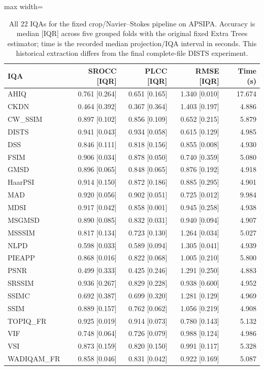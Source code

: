 \begin{table}[t!]
\centering
\caption{All 22 IQAs for the fixed crop/Navier--Stokes pipeline on APSIPA. Accuracy is median [IQR] across five grouped folds with the original fixed Extra Trees estimator; time is the recorded median projection/IQA interval in seconds. This historical extraction differs from the final complete-file DISTS experiment.}
\label{tab_review_projection_iqas}
\scriptsize
\begin{adjustbox}{max width=\textwidth}
\begin{tabular}{lrrrr}
\toprule
IQA & SROCC [IQR] & PLCC [IQR] & RMSE [IQR] & Time (s) \\
\midrule
AHIQ & 0.761 [0.264] & 0.651 [0.165] & 1.340 [0.010] & 17.674 \\
CKDN & 0.464 [0.392] & 0.367 [0.364] & 1.403 [0.197] & 4.886 \\
CW\_SSIM & 0.897 [0.102] & 0.856 [0.109] & 0.652 [0.215] & 5.879 \\
DISTS & 0.941 [0.043] & 0.934 [0.058] & 0.615 [0.129] & 4.985 \\
DSS & 0.846 [0.111] & 0.818 [0.156] & 0.855 [0.008] & 4.930 \\
FSIM & 0.906 [0.034] & 0.878 [0.050] & 0.740 [0.359] & 5.080 \\
GMSD & 0.896 [0.065] & 0.848 [0.065] & 0.876 [0.192] & 4.918 \\
HaarPSI & 0.914 [0.150] & 0.872 [0.186] & 0.885 [0.295] & 4.901 \\
MAD & 0.920 [0.056] & 0.902 [0.051] & 0.725 [0.012] & 9.984 \\
MDSI & 0.917 [0.042] & 0.858 [0.001] & 0.945 [0.258] & 4.938 \\
MSGMSD & 0.890 [0.085] & 0.832 [0.031] & 0.940 [0.094] & 4.907 \\
MSSSIM & 0.817 [0.134] & 0.723 [0.130] & 1.264 [0.034] & 5.027 \\
NLPD & 0.598 [0.033] & 0.589 [0.094] & 1.305 [0.041] & 4.939 \\
PIEAPP & 0.868 [0.016] & 0.822 [0.068] & 1.005 [0.210] & 5.800 \\
PSNR & 0.499 [0.333] & 0.425 [0.246] & 1.291 [0.250] & 4.883 \\
SRSSIM & 0.936 [0.267] & 0.829 [0.228] & 0.938 [0.600] & 4.952 \\
SSIMC & 0.692 [0.387] & 0.699 [0.320] & 1.281 [0.129] & 4.969 \\
SSIM & 0.889 [0.157] & 0.762 [0.062] & 1.056 [0.219] & 4.908 \\
TOPIQ\_FR & 0.925 [0.019] & 0.914 [0.073] & 0.780 [0.143] & 5.132 \\
VIF & 0.748 [0.064] & 0.726 [0.079] & 0.988 [0.124] & 4.986 \\
VSI & 0.873 [0.159] & 0.820 [0.150] & 0.991 [0.117] & 5.328 \\
WADIQAM\_FR & 0.858 [0.046] & 0.831 [0.042] & 0.922 [0.169] & 5.087 \\
\bottomrule
\end{tabular}
\end{adjustbox}
\end{table}
